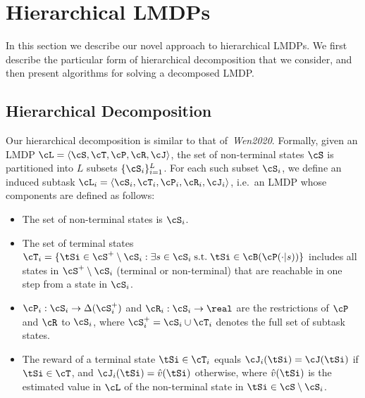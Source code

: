 
\section{Hierarchical LMDPs}

In this section we describe our novel approach to hierarchical LMDPs. We first describe the particular form of hierarchical decomposition that we consider, and then present algorithms for solving a decomposed LMDP.

\subsection{Hierarchical Decomposition}

Our hierarchical decomposition is similar to that of~\textit{Wen2020}. Formally, given an LMDP $\cL=\langle\cS,\cT,\cP,\cR,\cJ\rangle$, the set of non-terminal states $\cS$ is partitioned into $L$ subsets $\{\cS_i\}_{i=1}^L$. For each such subset $\cS_i$, we define an induced subtask $\cL_i=\langle\cS_i,\cT_i,\cP_i,\cR_i,\cJ_i\rangle$, i.e.~an LMDP whose components are defined as follows:
\begin{itemize}
\item The set of non-terminal states is $\cS_i$.
\item The set of terminal states $\cT_i=\{\tSi \in\cS^+\setminus\cS_i:\exists s\in \cS_i \; \text{s.t.} \; \tSi \in \cB(\cP(\cdot|s))\}$ includes all states in $\cS^+\setminus\cS_i$ (terminal or non-terminal) that are reachable in one step from a state in $\cS_i$.
\item $\cP_i:\cS_i\rightarrow\Delta(\cS_i^+)$ and $\cR_i:\cS_i\rightarrow\real$ are the restrictions of $\cP$ and $\cR$ to $\cS_i$, where $\cS_i^+=\cS_i\cup\cT_i$ denotes the full set of subtask states.
\item The reward of a terminal state $\tSi \in\cT_i$ equals $\cJ_i(\tSi)=\cJ(\tSi)$ if $\tSi\in\cT$, and $\cJ_i(\tSi)=\hat{v}(\tSi)$ otherwise, where $\hat{v}(\tSi)$ is the estimated value in $\cL$ of the non-terminal state in  $\tSi\in\cS \setminus \cS_i$.
\end{itemize}


